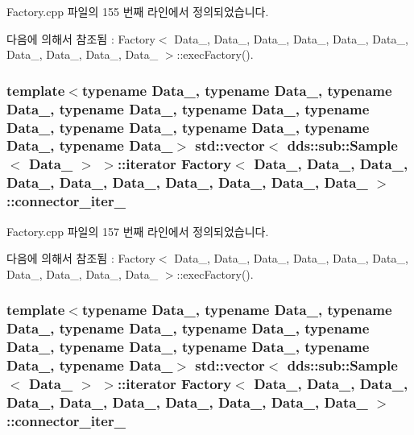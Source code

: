 Factory.\+cpp 파일의 155 번째 라인에서 정의되었습니다.



다음에 의해서 참조됨 \+:  Factory$<$ Data\+\_, Data\+\_, Data\+\_, Data\+\_, Data\+\_, Data\+\_, Data\+\_, Data\+\_, Data\+\_, Data\+\_ $>$\+::exec\+Factory().

\subsubsection[{\texorpdfstring{connector\+\_\+iter\+\_\+4}{connector_iter_4}}]{\setlength{\rightskip}{0pt plus 5cm}template$<$typename Data\+\_, typename Data\+\_, typename Data\+\_, typename Data\+\_, typename Data\+\_, typename Data\+\_, typename Data\+\_, typename Data\+\_, typename Data\+\_, typename Data\+\_$>$ std\+::vector$<$ dds\+::sub\+::\+Sample$<$ Data\+\_ $>$ $>$\+::iterator {\bf Factory}$<$ Data\+\_, Data\+\_, Data\+\_, Data\+\_, Data\+\_, Data\+\_, Data\+\_, Data\+\_, Data\+\_, Data\+\_ $>$\+::connector\+\_\+iter\+\_}\hypertarget{classFactory_aa664c801aed2472266996c3e3256c406}{}\label{classFactory_aa664c801aed2472266996c3e3256c406}


Factory.\+cpp 파일의 157 번째 라인에서 정의되었습니다.



다음에 의해서 참조됨 \+:  Factory$<$ Data\+\_, Data\+\_, Data\+\_, Data\+\_, Data\+\_, Data\+\_, Data\+\_, Data\+\_, Data\+\_, Data\+\_ $>$\+::exec\+Factory().

\subsubsection[{\texorpdfstring{connector\+\_\+iter\+\_\+5}{connector_iter_5}}]{\setlength{\rightskip}{0pt plus 5cm}template$<$typename Data\+\_, typename Data\+\_, typename Data\+\_, typename Data\+\_, typename Data\+\_, typename Data\+\_, typename Data\+\_, typename Data\+\_, typename Data\+\_, typename Data\+\_$>$ std\+::vector$<$ dds\+::sub\+::\+Sample$<$ Data\+\_ $>$ $>$\+::iterator {\bf Factory}$<$ Data\+\_, Data\+\_, Data\+\_, Data\+\_, Data\+\_, Data\+\_, Data\+\_, Data\+\_, Data\+\_, Data\+\_ $>$\+::connector\+\_\+iter\+\_}\hypertarget{classFactory_addefc1a08fde4845b9d68bd9c0743f94}{}\label{classFactory_addefc1a08fde4845b9d68bd9c0743f94}



